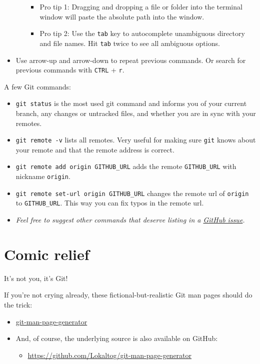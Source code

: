 \documentclass[
]{book}
\providecommand{\tightlist}{%
  \setlength{\itemsep}{0pt}\setlength{\parskip}{0pt}}
\begin{document}
\begin{itemize}
\begin{itemize}
    \begin{itemize}
    \tightlist
    \item
      Pro tip 1: Dragging and dropping a file or folder into the terminal window will paste the absolute path into the window.
    \item
      Pro tip 2: Use the \texttt{tab} key to autocomplete unambiguous directory and file names. Hit \texttt{tab} twice to see all ambiguous options.
    \end{itemize}
  \end{itemize}
\item
  Use arrow-up and arrow-down to repeat previous commands. Or search for previous commands with \texttt{CTRL} + \texttt{r}.
\end{itemize}

A few Git commands:

\begin{itemize}
\tightlist
\item
  \texttt{git\ status} is the most used git command and informs you of your current branch, any changes or untracked files, and whether you are in sync with your remotes.
\item
  \texttt{git\ remote\ -v} lists all remotes. Very useful for making sure \texttt{git} knows about your remote and that the remote address is correct.
\item
  \texttt{git\ remote\ add\ origin\ GITHUB\_URL} adds the remote \texttt{GITHUB\_URL} with nickname \texttt{origin}.
\item
  \texttt{git\ remote\ set-url\ origin\ GITHUB\_URL} changes the remote url of \texttt{origin} to \texttt{GITHUB\_URL}. This way you can fix typos in the remote url.
\item
  \emph{Feel free to suggest other commands that deserve listing in a \href{https://github.com/jennybc/happy-git-with-r/issues}{GitHub issue}.}
\end{itemize}

\chapter{Comic relief}\label{comic-relief}

It's not you, it's Git!

If you're not crying already, these fictional-but-realistic Git man pages should do the trick:

\begin{itemize}
\tightlist
\item
  \href{http://git-man-page-generator.lokaltog.net}{git-man-page-generator}
\item
  And, of course, the underlying source is also available on GitHub:

  \begin{itemize}
  \tightlist
  \item
    \url{https://github.com/Lokaltog/git-man-page-generator}
  \end{itemize}
\end{itemize}
\end{document}
